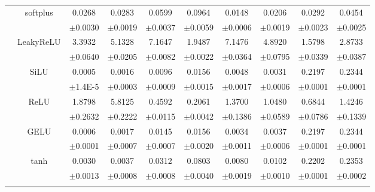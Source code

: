 \documentclass{article}
\begin{document}
\begin{longtable}[h!]{cccccccccc}
        & \multirow{2}{*}{softplus}
        &0.0268 & 0.0283 & 0.0599 & 0.0964 & 0.0148 & 0.0206 & 0.0292 & 0.0454\\
        &&\scriptsize $\pm$0.0030&\scriptsize$\pm$0.0019&\scriptsize$\pm$0.0037&\scriptsize$\pm$0.0059&\scriptsize$\pm$0.0006&\scriptsize$\pm$0.0019&\scriptsize$\pm$0.0023&\scriptsize$\pm$0.0025\\
        \cline{3-10}\rule{0pt}{2.3ex}

        & \multirow{2}{*}{LeakyReLU}
        &3.3932 & 5.1328 & 7.1647 & 1.9487 & 7.1476 & 4.8920 & 1.5798 & 2.8733\\
        &&\scriptsize $\pm$0.0640&\scriptsize$\pm$0.0205&\scriptsize$\pm$0.0082&\scriptsize$\pm$0.0022&\scriptsize$\pm$0.0364&\scriptsize$\pm$0.0795&\scriptsize$\pm$0.0339&\scriptsize$\pm$0.0387\\

        \hline\rule{0pt}{2.3ex} 


        \multirow{14}{*}{\textsf{MAE\textsubscript{$\Delta$ep}}} 
        & \multirow{2}{*}{SiLU}
        & {0.0005} & {0.0016} & {0.0096} & {0.0156} & {0.0048} & {0.0031} & {0.2197} & {0.2344} \\
        && \tiny {$\pm$1.4E-5} & \scriptsize {$\pm$0.0003} & \scriptsize {$\pm$0.0009} & \scriptsize {$\pm$0.0015} & \scriptsize {$\pm$0.0017} & \scriptsize {$\pm$0.0006} & \scriptsize {$\pm$0.0001} & \scriptsize {$\pm$0.0001}\\
        \cline{3-10}\rule{0pt}{2.3ex}

        & \multirow{2}{*}{ReLU}
        &1.8798 & 5.8125 & 0.4592 & 0.2061 & 1.3700 & 1.0480 & 0.6844 & 1.4246\\
        &&\scriptsize $\pm$0.2632&\scriptsize$\pm$0.2222&\scriptsize$\pm$0.0115&\scriptsize$\pm$0.0042&\scriptsize$\pm$0.1386&\scriptsize$\pm$0.0589&\scriptsize$\pm$0.0786&\scriptsize$\pm$0.1339\\
        \cline{3-10}\rule{0pt}{2.3ex}

        & \multirow{2}{*}{GELU}
        &0.0006 & 0.0017 & 0.0145 & 0.0156 & 0.0034 & 0.0037 & 0.2197 & 0.2344\\
        &&\scriptsize $\pm$0.0001&\scriptsize$\pm$0.0007&\scriptsize$\pm$0.0007&\scriptsize$\pm$0.0020&\scriptsize$\pm$0.0011&\scriptsize$\pm$0.0006&\scriptsize$\pm$0.0001&\scriptsize$\pm$0.0001\\
        \cline{3-10}\rule{0pt}{2.3ex}


        & \multirow{2}{*}{tanh}
        &0.0030 & 0.0037 & 0.0312 & 0.0803 & 0.0080 & 0.0102 & 0.2202 & 0.2353\\
        &&\scriptsize $\pm$0.0013&\scriptsize$\pm$0.0008&\scriptsize$\pm$0.0008&\scriptsize$\pm$0.0040&\scriptsize$\pm$0.0019&\scriptsize$\pm$0.0010&\scriptsize$\pm$0.0001&\scriptsize$\pm$0.0002\\
        \cline{3-10}\rule{0pt}{2.3ex}


\end{longtable}
\end{document}
